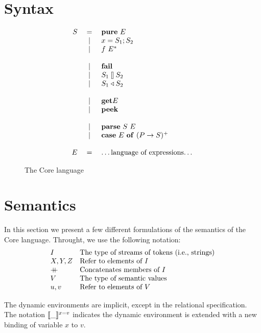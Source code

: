 \documentclass{article}
\begin{document}
\section{Syntax}

\begin{figure}[H]
{\setlength{\arraycolsep}{0pt}
\[
\begin{array}{rcl}
S &{}={}& \mathbf{pure}~{E} \\
  &{}|{}& {x} = {S_1}; {S_2} \\
  &{}|{}& {f}~{E^*} \\
\\
  &{}|{}& \mathbf{fail} \\
  &{}|{}& {S_1} \talloblong {S_2} \\
  &{}|{}& {S_1} \triangleleft {S_2} \\
\\
  &{}|{}& \mathbf{get}{E} \\
  &{}|{}& \mathbf{peek} \\
\\
  &{}|{}& \mathbf{parse}~{S}~{E} \\
  &{}|{}& \mathbf{case}~{E}~\mathbf{of}~{(P \to S)^+} \\
\\
E &{}={}& \text{\dots language of expressions\dots} \\
\end{array}
\]
}
\caption{The Core language}
\end{figure}


\section{Semantics}

In this section we present a few different formulations of the semantics
of the Core language.  Throught, we use the following notation:
\[
\begin{array}{ll}
I       & \text{The type of streams of tokens (i.e., strings)} \\
X,Y,Z   & \text{Refer to elements of $I$} \\
+\!\!\!+ & \text{Concatenates members of $I$} \\
V       & \text{The type of semantic values} \\
u,v     & \text{Refer to elements of $V$}
\end{array}
\]

The dynamic environments are implicit, except in the relational specification.
The notation $\llbracket{ \_ }\rrbracket^{x=v}$ indicates the dynamic environment is extended
with a new binding of variable $x$ to $v$.
\end{document}
